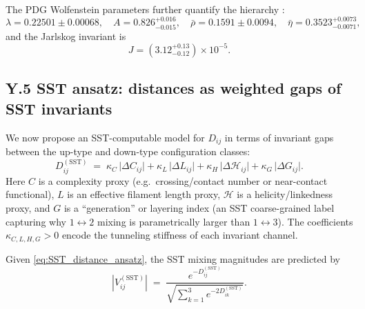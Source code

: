 \documentclass[10pt]{article}
\begin{document}
        The PDG Wolfenstein parameters further quantify the hierarchy \cite{PDG2025_CKM}:
        \begin{equation}
            \lambda = 0.22501\pm0.00068,\quad
            A = 0.826^{+0.016}_{-0.015},\quad
            \bar{\rho}=0.1591\pm0.0094,\quad
            \bar{\eta}=0.3523^{+0.0073}_{-0.0071},
            \label{eq:PDG2025_wolf}
        \end{equation}
        and the Jarlskog invariant is
        \begin{equation}
            J = \left(3.12^{+0.13}_{-0.12}\right)\times 10^{-5}.
            \label{eq:PDG2025_J}
        \end{equation}

    \subsection*{Y.5 SST ansatz: distances as weighted gaps of SST invariants}

        We now propose an SST-computable model for $D_{ij}$ in terms of invariant gaps between the
        up-type and down-type configuration classes:
        \begin{equation}
            D^{(\text{SST})}_{ij}
            \;=\;
            \kappa_C\,\big|\Delta C_{ij}\big|
            +\kappa_L\,\big|\Delta L_{ij}\big|
            +\kappa_H\,\big|\Delta \mathcal{H}_{ij}\big|
            +\kappa_G\,\big|\Delta G_{ij}\big|.
            \label{eq:SST_distance_ansatz}
        \end{equation}
        Here $C$ is a complexity proxy (e.g.\ crossing/contact number or near-contact functional),
        $L$ is an effective filament length proxy,
        $\mathcal{H}$ is a helicity/linkedness proxy,
        and $G$ is a ``generation'' or layering index (an SST coarse-grained label capturing why $1\!\leftrightarrow\!2$
        mixing is parametrically larger than $1\!\leftrightarrow\!3$).
        The coefficients $\kappa_{C,L,H,G}>0$ encode the tunneling stiffness of each invariant channel.

        Given \eqref{eq:SST_distance_ansatz}, the SST mixing magnitudes are predicted by
        \begin{equation}
            |V^{(\text{SST})}_{ij}|
            \;=\;
            \frac{e^{-D^{(\text{SST})}_{ij}}}{\sqrt{\sum_{k=1}^3 e^{-2D^{(\text{SST})}_{ik}}}}.
            \label{eq:SST_V_from_D}
        \end{equation}
\end{document}
